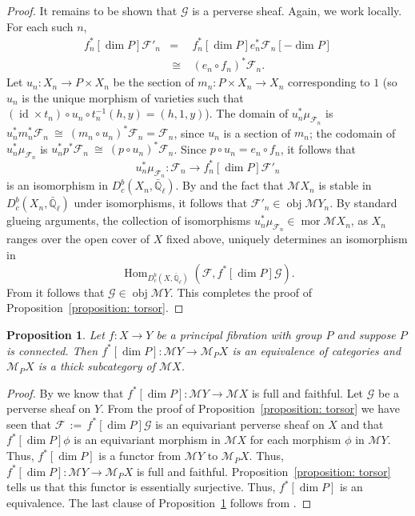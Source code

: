 \documentclass[10pt]{amsart}
\theoremstyle{plain}
\newtheorem{proposition}[theorem]{Proposition}
\theoremstyle{definition}
\newcommand{\EE}{\mathbb{\bar Q}_\ell}
\DeclareMathOperator{\Hom}{Hom}
\DeclareMathOperator{\id}{id}
\DeclareMathOperator{\obj}{obj}
\DeclareMathOperator{\mor}{mor}
\newcommand{\ceq}{{\, :=\, }}
\newcommand{\iso}{{\ \cong\ }}
\begin{document}
\begin{proof}
It remains to be shown that $\mathcal{G}$ is a perverse sheaf. Again, we work locally. For each such $n$,
\begin{eqnarray*}
{f}_n^*[\dim{P}] \mathcal{F}'_n 
	&=& {f}_n^*[\dim{P}] {e}_n^* \mathcal{F}_n [-\dim{P}]\\
	&\iso& ({e}_n\circ {f}_n)^* \mathcal{F}_n.
\end{eqnarray*}
Let ${u}_n : {X}_n \to {P}\times{X}_n$ be the section of ${m}_n : {P}\times{X}_n \to {X}_n$ corresponding to $1$ (so ${u}_n$ is the unique morphism of varieties such that $(\id\times{t}_n)\circ {u}_n \circ {t}_n^{-1} (h,y) = (h,1,y)$). The domain of ${u}_n^*\mu_{\mathcal{F}_n}$ is ${u}_n^*{m}_n^* \mathcal{F}_n \iso ({m}_n \circ {u}_n)^* \mathcal{F}_n = \mathcal{F}_n$, since ${u}_n$ is a section of ${m}_n$; the codomain of ${u}_n^* \mu_{\mathcal{F}_n}$ is ${u}_n^* p^* \mathcal{F}_n \iso (p\circ {u}_n)^*\mathcal{F}_n$. Since $p\circ {u}_n = {e}_n \circ {f}_n$, it follows that 
\[
{u}_n^* \mu_{\mathcal{F}_n} : \mathcal{F}_n \to {f}_n^*[\dim{P}] \mathcal{F}'_n
\]
is an isomorphism in $D^b_c({X}_n, \EE)$. By \cite[Prop~4.2.5]{BBD} and the fact that ${\mathcal M}{X}_n$ is stable in $D^b_c({X}_n, \EE)$ under isomorphisms, it follows that $\mathcal{F}'_n \in \obj {\mathcal M}{Y}_n$. By standard glueing arguments, the collection of isomorphisms ${u}_n^* \mu_{\mathcal{F}_n} \in \mor{\mathcal M}{X}_n$, as ${X}_n$ ranges over the open cover of ${X}$ fixed above, uniquely determines an isomorphism in \[
\Hom_{D^b_c({X}, \EE)}(\mathcal{F},{f}^*[\dim{P}] \mathcal{G}).
\]  
From \cite[Prop~4.2.5]{BBD}  it follows that $\mathcal{G}\in \obj{\mathcal M}{Y}$. This completes the proof of Proposition~\ref{proposition: torsor}.
\end{proof}

\begin{proposition}\label{proposition: more torsor}
Let ${f} : {X} \to {Y}$ be a principal fibration with group ${P}$ and suppose ${P}$ is connected. Then ${f}^*[\dim{P}] : {\mathcal M}{Y} \to {\mathcal M}_{P}{X}$ is an equivalence of categories and ${\mathcal M}_{P}{X}$ is a thick subcategory of ${\mathcal M}{X}$.
\end{proposition}

\begin{proof}
By \cite[Prop~4.2.5]{BBD} we know that ${f}^*[\dim{P}] : {\mathcal M}{Y} \to {\mathcal M}{X}$ is full and faithful. Let $\mathcal{G}$ be a perverse sheaf on ${Y}$. From the proof of Proposition~\ref{proposition: torsor} we have seen that $\mathcal{F} \ceq {f}^*[\dim{P}] \mathcal{G}$ is an equivariant perverse sheaf on ${X}$ and that ${f}^*[\dim{P}] \phi$ is an equivariant morphism in ${\mathcal M}{X}$ for each morphism $\phi$ in ${\mathcal M}{Y}$. Thus, ${f}^*[\dim{P}]$ is a functor from ${\mathcal M}{Y}$ to ${\mathcal M}_{P}{X}$. Thus, ${f}^*[\dim{P}] : {\mathcal M}{Y} \to {\mathcal M}_{P}{X}$ is full and faithful. Proposition~\ref{proposition: torsor} tells us that this functor is essentially surjective. Thus, ${f}^*[\dim{P}]$ is an equivalence. The last clause of Proposition~\ref{proposition: more torsor} follows from \cite[4.2.6]{BBD}.
\end{proof}
\end{document}
